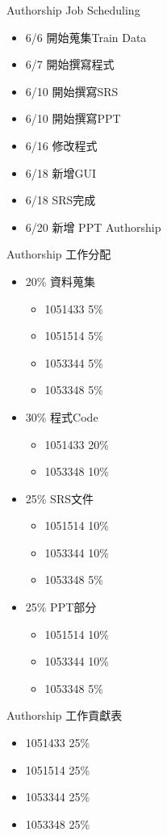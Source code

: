 \documentclass{beamer}
\begin{document}
\begin{frame}{Authorship }{Job Scheduling }
\begin{CJK*}{UTF8}{bsmi}
\begin{itemize}
  \item{
   6/6 開始蒐集Train Data
}
  \item {
  6/7 開始撰寫程式
  }
  \item {
   6/10 開始撰寫SRS
  }
 \item{
  6/10 開始撰寫PPT
}
\item{
 6/16 修改程式
}
\item{
 6/18 新增GUI
}
\item{
 6/18 SRS完成
}
\item{
 6/20 新增 PPT Authorship 
}
  \end{itemize}
\end{CJK*}
\end{frame}

\begin{CJK*}{UTF8}{bsmi}
\begin{frame}{Authorship }{工作分配}
\begin{itemize}
  \item{
   20\% 資料蒐集
	\begin{itemize}
  	\item{
		1051433  5\%
           }
	\item{
		1051514  5\%
           }
	\item{
		1053344  5\%
           }
	\item{
		1053348  5\%
           }
 	 \end{itemize}
}
  \item {
  30\% 程式Code
	\begin{itemize}
  	\item{
		1051433  20\%
           }
	\item{
		1053348  10\%
           }
 	 \end{itemize}
  }
  \item {
   25\% SRS文件
	\begin{itemize}
	\item{
		1051514  10\%
           }
	\item{
		1053344  10\%
           }
	\item{
		1053348  5\%
           }
 	 \end{itemize}
  }
 \item{
  25\% PPT部分
	\begin{itemize}
	\item{
		1051514  10\%
           }
	\item{
		1053344  10\%
           }
	\item{
		1053348  5\%
           }
 	 \end{itemize}	
}
 \end{itemize}
\end{frame}
\end{CJK*}

\begin{CJK*}{UTF8}{bsmi}
\begin{frame}{Authorship }{工作貢獻表}
\begin{itemize}
  \item{
  1051433   25\%
}
  \item {
  1051514   25\%
  }
  \item {
  1053344   25\%
  }
 \item{
 1053348   25\%
}
 \end{itemize}

\end{frame}
\end{CJK*}
\end{document}

